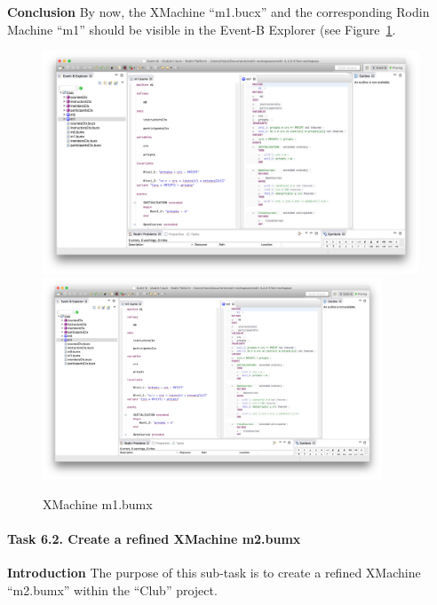 \textbf{Conclusion} By now, the XMachine ``m1.bucx'' and the corresponding Rodin Machine ``m1'' should be visible in the Event-B Explorer (see Figure~\ref{fig:M1}.
  \begin{figure}[!htbp]
    \centering
    \ifplastex
    \includegraphics[width=512]{figures/M1}
    \else
    \includegraphics[width=0.9\textwidth]{figures/M1}
    \fi
    \caption{XMachine m1.bumx}
    \label{fig:M1}
  \end{figure}

\paragraph{Task 6.2. Create a refined XMachine m2.bumx}
\textbf{Introduction} The purpose of this sub-task is to create a refined XMachine ``m2.bumx'' within the ``Club'' project.

